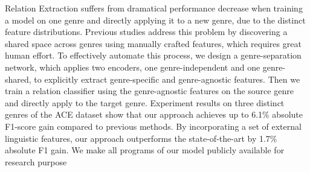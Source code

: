 Relation Extraction suffers from dramatical performance decrease when training a model on one genre and directly applying it to a new genre, due to the distinct feature distributions. Previous studies address this problem by discovering a shared space across genres using manually crafted features, which requires great human effort. To effectively automate this process, we design a genre-separation network, which applies two encoders, one genre-independent and one genre-shared, to explicitly extract genre-specific and genre-agnostic features. Then we train a relation classifier using the genre-agnostic features on the source genre and directly apply to the target genre. Experiment results on three distinct genres of the ACE dataset show that our approach achieves up to 6.1\% absolute F1-score gain compared to previous methods. By incorporating a set of external linguistic features, our approach outperforms the state-of-the-art by 1.7\% absolute F1 gain. We make all programs of our model publicly available for research purpose
